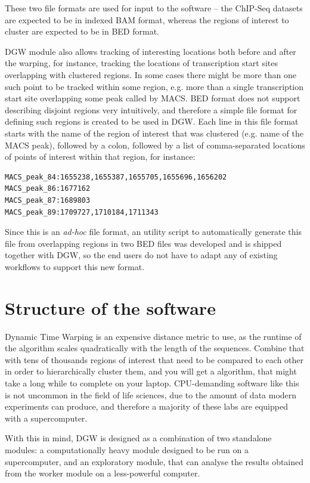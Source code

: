 \documentclass[parskip]{cs4rep}
\begin{document}
These two file formats are used for input to the software -- the ChIP-Seq datasets are expected to be in indexed BAM format, whereas the regions of interest to cluster are expected to be in BED format.

DGW module also allows tracking of interesting locations both before and after the warping, for instance, tracking the locations of transcription start sites overlapping with clustered regions. In some cases there might be more than one such point to be tracked within some region, e.g. more than a single transcription start site overlapping some peak called by MACS. BED format does not support describing disjoint regions very intuitively, and therefore a simple file format for defining such regions is created to be used in DGW. Each line in this file format starts with the name of the region of interest that was clustered (e.g. name of the MACS peak), followed by a colon, followed by a list of comma-separated locations of points of interest within that region, for instance:

\begin{verbatim}
MACS_peak_84:1655238,1655387,1655705,1655696,1656202
MACS_peak_86:1677162
MACS_peak_87:1689803
MACS_peak_89:1709727,1710184,1711343
\end{verbatim}

Since this is an \emph{ad-hoc} file format, an utility script to automatically generate this file from overlapping regions in two BED files was developed and is shipped together with DGW, so the end users do not have to adapt any of existing workflows to support this new format.

\section{Structure of the software}
Dynamic Time Warping is an expensive distance metric to use, as the runtime of the algorithm scales quadratically with the length of the sequences. Combine that with tens of thousands regions of interest  that need to be compared to each other in order to hierarchically cluster them, and you will get a algorithm, that might take a long while to complete on your laptop. CPU-demanding software like this is not uncommon in the field of life sciences, due to the amount of data modern experiments can produce, and therefore a majority of these labs are equipped with a supercomputer. 

With this in mind, DGW is designed as a combination of two standalone modules: a computationally heavy module designed to be run on a supercomputer, and an exploratory module, that can analyse the results obtained from the worker module on a less-powerful computer.
\end{document}
